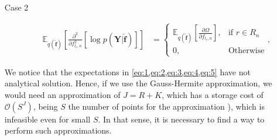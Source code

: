\documentclass[9pt]{article}
\providecommand{\ve}[1]{{\bm{#1}}}%
\providecommand{\mat}[1]{{\bm{#1}}} %
\providecommand{\ve}[1]{{\mathbf{#1}}}
\providecommand{\mat}[1]{{\mathbf{#1}}}
\newcommand{\fracpartial}[2]{\frac{\partial #1}{\partial  #2}} %
\begin{document}
\begin{enumerate}
\begin{description}
\begin{align}
		 \label{eq:4}
		\end{align}
		\item[Case 2] 
		\begin{align}
		 \mathbb{E}_{q(\hat{\ve{f}})}\left[\fracpartial{^2}{f_{l_r,n}^2}\left[\log p(\mat{Y}|\hat{\ve{f}})\right]\right] &= \begin{cases}
		\mathbb{E}_{q(\hat{\ve{f}})}\left[\fracpartial{\Omega}{f_{l_r,n}}\right], & \mbox{if $r\in R_n$}\\
		0, & \mbox{Otherwise}
		\end{cases},
		\label{eq:5}
		\end{align}
	\end{description}
We notice that the expectations in \cref{eq:1,eq:2,eq:3,eq:4,eq:5} have not analytical solution. Hence, if we use the Gauss-Hermite approximation, we would need an approximation of $J=R+K$, which has a storage cost of $\mathcal{O}(S^{J})$, being $S$ the number of points for the approximation \cite{moreno2018heterogeneous}), which is infeasible even for small $S$. In that sense, it is necessary to find a way to perform such approximations.


\end{enumerate}
\end{document}
